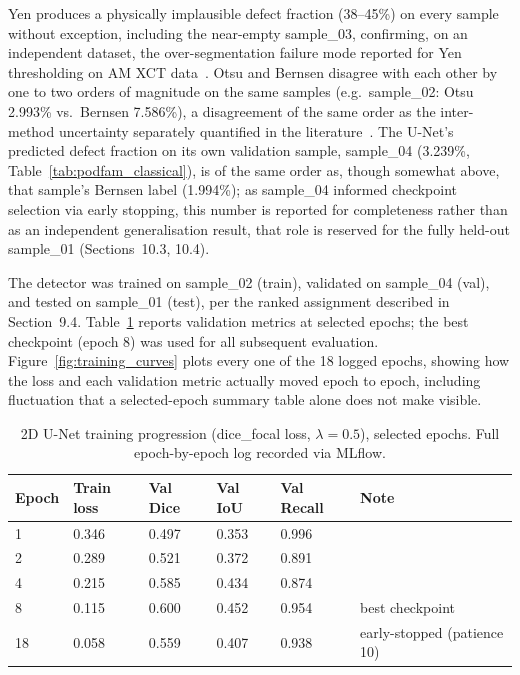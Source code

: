 Yen produces a physically implausible defect fraction (38--45\%) on every sample without exception,
including the near-empty sample\_03, confirming, on an independent dataset, the over-segmentation
failure mode reported for Yen thresholding on AM XCT data~\citep{Kim2017}. Otsu and Bernsen disagree
with each other by one to two orders of magnitude on the same samples (e.g.\ sample\_02: Otsu 2.993\%
vs.\ Bernsen 7.586\%), a disagreement of the same order as the inter-method uncertainty separately
quantified in the literature~\citep{AppliedSciences2025}. The U-Net's predicted defect fraction on
its own validation sample, sample\_04 (3.239\%, Table~\ref{tab:podfam_classical}), is of the same
order as, though somewhat above, that sample's Bernsen label (1.994\%); as sample\_04 informed
checkpoint selection via early stopping, this number is reported for completeness rather than as an
independent generalisation result, that role is reserved for the fully held-out sample\_01
(Sections~10.3, 10.4).

The detector was trained on sample\_02 (train), validated on sample\_04 (val), and tested on
sample\_01 (test), per the ranked assignment described in Section~9.4. Table~\ref{tab:podfam_epochs}
reports validation metrics at selected epochs; the best checkpoint (epoch 8) was used for all
subsequent evaluation. Figure~\ref{fig:training_curves} plots every one of the 18 logged epochs,
showing how the loss and each validation metric actually moved epoch to epoch, including fluctuation
that a selected-epoch summary table alone does not make visible.

\begin{table}[htbp]
\centering
\caption{2D U-Net training progression (dice\_focal loss, $\lambda = 0.5$), selected epochs. Full
  epoch-by-epoch log recorded via MLflow.}
\label{tab:podfam_epochs}
\begin{tabular}{llllll}
\toprule
\textbf{Epoch} & \textbf{Train loss} & \textbf{Val Dice} & \textbf{Val IoU} & \textbf{Val Recall} & \textbf{Note} \\
\midrule
1  & 0.346 & 0.497 & 0.353 & 0.996 & \\
2  & 0.289 & 0.521 & 0.372 & 0.891 & \\
4  & 0.215 & 0.585 & 0.434 & 0.874 & \\
8  & 0.115 & 0.600 & 0.452 & 0.954 & best checkpoint \\
18 & 0.058 & 0.559 & 0.407 & 0.938 & early-stopped (patience 10) \\
\bottomrule
\end{tabular}
\end{table}

